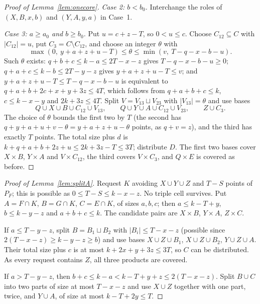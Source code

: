 \documentclass[11pt]{article}
\numberwithin{equation}{section}
\theoremstyle{definition}
\theoremstyle{remark}
\begin{document}
\begin{proof}[Proof of Lemma~\ref{lem:onecore}]
\emph{Case 2: $b<b_0$.} Interchange the roles of $(X,B,x,b)$ and
$(Y,A,y,a)$ in Case~1.

\emph{Case 3: $a\ge a_0$ and $b\ge b_0$.} Put $u=c+z-T$, so $0<u\le c$.
Choose $C_{12}\subseteq C$ with $|C_{12}|=u$, put $C_3=C\setminus C_{12}$,
and choose an integer $\theta$ with
\[
 \max(0,\ y+a+z+u-T)\le\theta\le\min(v,\ T-q-x-b-u).
\]
Such $\theta$ exists: $q+b+c\le k-a\le2T-x-z$ gives $T-q-x-b-u\ge0$;
$q+a+c\le k-b\le2T-y-z$ gives $y+a+z+u-T\le v$; and
$y+a+z+u-T\le T-q-x-b-u$ is equivalent to $q+a+b+2c+x+y+3z\le4T$, which
follows from $q+a+b+c\le k$, $c\le k-x-y$ and $2k+3z\le4T$. Split
$V=V_{13}\sqcup V_{23}$ with $|V_{13}|=\theta$ and use bases
\[
 Q\cup X\cup B\cup C_{12}\cup V_{13},\qquad
 Q\cup Y\cup A\cup C_{12}\cup V_{23},\qquad Z\cup C_3 .
\]
The choice of $\theta$ bounds the first two by $T$ (the second has
$q+y+a+u+v-\theta=y+a+z+u-\theta$ points, as $q+v=z$), and the third has
exactly $T$ points. The total size plus $d$ is
$k+q+a+b+2z+u\le2k+3z-T\le3T$; distribute $D$. The first two bases cover
$X\times B$, $Y\times A$ and $V\times C_{12}$, the third covers
$V\times C_3$, and $Q\times E$ is covered as before.
\end{proof}

\begin{proof}[Proof of Lemma~\ref{lem:splitA}]
Request $K$ avoiding $X\cup Y\cup Z$ and $T-S$ points of $P_F$; this is
possible as $0\le T-S\le k-x-z$. No triple cell survives. Put
$A=F\cap K$, $B=G\cap K$, $C=E\cap K$, of sizes $a,b,c$; then
$a\le k-T+y$, $b\le k-y-z$ and $a+b+c\le k$. The candidate pairs are
$X\times B$, $Y\times A$, $Z\times C$.

If $a\le T-y-z$, split $B=B_1\sqcup B_2$ with $|B_i|\le T-x-z$ (possible
since $2(T-x-z)\ge k-y-z\ge b$) and use bases $X\cup Z\cup B_1$,
$X\cup Z\cup B_2$, $Y\cup Z\cup A$. Their total size plus $c$ is at most
$k+2x+y+3z\le3T$, so $C$ can be distributed. As every request contains
$Z$, all three products are covered.

If $a>T-y-z$, then $b+c\le k-a<k-T+y+z\le2(T-x-z)$. Split $B\cup C$ into
two parts of size at most $T-x-z$ and use $X\cup Z$ together with one
part, twice, and $Y\cup A$, of size at most $k-T+2y\le T$.
\end{proof}
\end{document}
